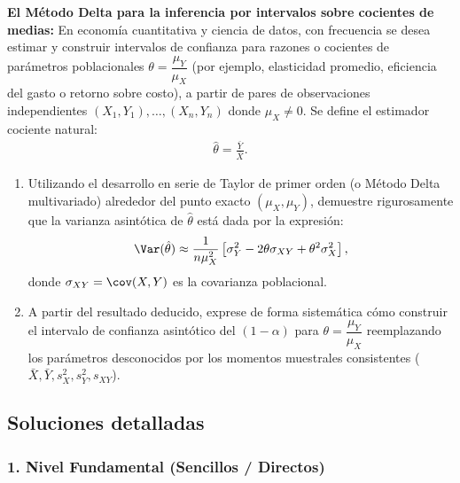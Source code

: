 \begin{problema}
	\label{prob:ic-desaf-delta-method}
	\textbf{El Método Delta para la inferencia por intervalos sobre cocientes de medias:}
	En economía cuantitativa y ciencia de datos, con frecuencia se desea estimar y construir intervalos de confianza para razones o cocientes de parámetros poblacionales $\theta = \dfrac{\mu_Y}{\mu_X}$ (por ejemplo, elasticidad promedio, eficiencia del gasto o retorno sobre costo), a partir de pares de observaciones independientes $(X_1, Y_1), \dots, (X_n, Y_n)$ donde $\mu_X \neq 0$. Se define el estimador cociente natural:
	\begin{align}
		\hat{\theta} = \frac{\bar{Y}}{\bar{X}}.
	\end{align}
	\begin{enumerate}
		\item Utilizando el desarrollo en serie de Taylor de primer orden (o Método Delta multivariado) alrededor del punto exacto $(\mu_X, \mu_Y)$, demuestre rigurosamente que la varianza asintótica de $\hat{\theta}$ está dada por la expresión:
		\begin{align}
			\Var(\hat{\theta}) \approx \frac{1}{n \mu_X^2} \left[ \sigma_Y^2 - 2\theta \sigma_{XY} + \theta^2 \sigma_X^2 \right],
		\end{align}
		donde $\sigma_{XY} = \cov(X, Y)$ es la covarianza poblacional.
		\item A partir del resultado deducido, exprese de forma sistemática cómo construir el intervalo de confianza asintótico del $(1-\alpha)$ para $\theta = \dfrac{\mu_Y}{\mu_X}$ reemplazando los parámetros desconocidos por los momentos muestrales consistentes ($\bar{X}, \bar{Y}, s_X^2, s_Y^2, s_{XY}$).
	\end{enumerate}
\end{problema}


\subsection{Soluciones detalladas}

\subsubsection*{1. Nivel Fundamental (Sencillos / Directos)}

